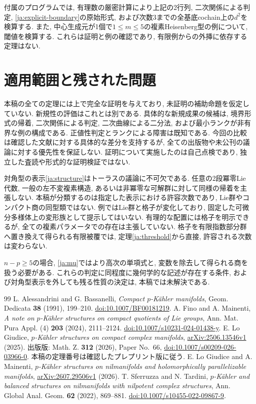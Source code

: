 \documentclass[12pt]{amsart}
\theoremstyle{definition}
\theoremstyle{remark}
\numberwithin{equation}{section}
\begin{document}
付属のプログラムでは, 有理数の厳密計算により上記の2行列,
二次関係による判定, \eqref{ja:explicit-boundary}の原始形式,
および次数3までの全基底cochain上の$d^2$を検算する.
また, 中心生成元が1個で$1\leq m\leq5$の複素Heisenberg型の例について,
閾値を検算する. これらは証明と例の確認であり,
有限例からの外挿に依存する定理はない.

\section{適用範囲と残された問題}
本稿の全ての定理には上で完全な証明を与えており,
未証明の補助命題を仮定していない.
新規性の評価はこれとは別である. 具体的な新規成果の候補は,
境界形式の帰着, 二次関係による判定, 二次曲線による二分法,
および最小ランクが非有界な例の構成である.
正値性判定とランクによる障害は既知である.
今回の比較は確認した文献に対する具体的な差分を支持するが,
全ての出版物や未公刊の議論に対する優先性を保証しない.
証明について実施したのは自己点検であり,
独立した査読や形式的な証明検証ではない.

対角型の表示\eqref{ja:structure}はトーラスの議論に不可欠である.
任意の2段冪零Lie代数, 一般の左不変複素構造,
あるいは非冪零な可解群に対して同様の帰着を主張しない.
本稿が分類するのは指定した表示における許容次数であり,
Lie群やコンパクト商の同型類ではない.
例ではLie群と格子が変化しており,
固定した可微分多様体上の変形族として提示してはいない.
有理的な配置には格子を明示できるが,
全ての複素パラメータでの存在は主張していない.
格子を有限指数部分群へ置き換えて得られる有限被覆では,
定理\ref{ja:threshold}から直接, 許容される次数は変わらない.

$n-p\geq5$の場合, \eqref{ja:mu}ではより高次の単項式と,
変数を除去して得られる商を扱う必要がある.
これらの判定に同程度に幾何学的な記述が存在する条件,
および対角型表示を外しても残る性質の決定は,
本稿では未解決である.

\begin{thebibliography}{99}
 L. Alessandrini and G. Bassanelli,
\emph{Compact $p$-K\"ahler manifolds}, Geom. Dedicata \textbf{38} (1991),
199--210. \href{https://doi.org/10.1007/BF00181219}{doi:10.1007/BF00181219}.
 A. Fino and A. Mainenti,
\emph{A note on $p$-K\"ahler structures on compact quotients of Lie groups},
Ann. Mat. Pura Appl. (4) \textbf{203} (2024), 2111--2124.
\href{https://doi.org/10.1007/s10231-024-01438-y}{doi:10.1007/s10231-024-01438-y}.
 E. Lo Giudice,
\emph{$p$-K\"ahler structures on compact complex manifolds},
\href{https://arxiv.org/abs/2506.13546v1}{arXiv:2506.13546v1} (2025).
出版版: Math. Z. \textbf{312} (2026), Paper No.~66,
\href{https://doi.org/10.1007/s00209-026-03966-0}{doi:10.1007/s00209-026-03966-0}.
本稿の定理番号は確認したプレプリント版に従う.
 E. Lo Giudice and A. Mainenti,
\emph{$p$-K\"ahler structures on nilmanifolds and holomorphically
parallelizable manifolds},
\href{https://arxiv.org/abs/2607.29506v1}{arXiv:2607.29506v1} (2026).
 T. Sferruzza and N. Tardini,
\emph{$p$-K\"ahler and balanced structures on nilmanifolds with nilpotent
complex structures}, Ann. Global Anal. Geom. \textbf{62} (2022), 869--881.
\href{https://doi.org/10.1007/s10455-022-09867-9}{doi:10.1007/s10455-022-09867-9}.
\end{thebibliography}
\end{document}
